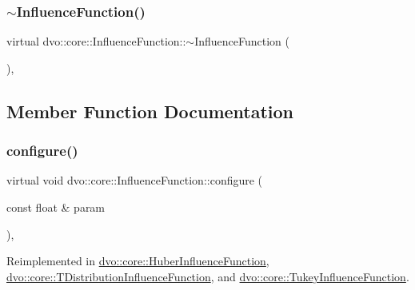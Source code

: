 \subsubsection{\texorpdfstring{$\sim$\+Influence\+Function()}{~InfluenceFunction()}}
{\footnotesize\ttfamily virtual dvo\+::core\+::\+Influence\+Function\+::$\sim$\+Influence\+Function (\begin{DoxyParamCaption}{ }\end{DoxyParamCaption})\hspace{0.3cm}{\ttfamily [inline]}, {\ttfamily [virtual]}}



\subsection{Member Function Documentation}
\mbox{\label{classdvo_1_1core_1_1_influence_function_a4773b03ca609bc5d8391d09d92ab34ad}} 
\subsubsection{\texorpdfstring{configure()}{configure()}}
{\footnotesize\ttfamily virtual void dvo\+::core\+::\+Influence\+Function\+::configure (\begin{DoxyParamCaption}\item[{const float \&}]{param }\end{DoxyParamCaption})\hspace{0.3cm}{\ttfamily [inline]}, {\ttfamily [virtual]}}



Reimplemented in \mbox{\hyperlink{classdvo_1_1core_1_1_huber_influence_function_aab5a25ad6f632e829c8ad2ccf073fdec}{dvo\+::core\+::\+Huber\+Influence\+Function}}, \mbox{\hyperlink{classdvo_1_1core_1_1_t_distribution_influence_function_ad9030e81f013c14015c3ad97a2f821be}{dvo\+::core\+::\+T\+Distribution\+Influence\+Function}}, and \mbox{\hyperlink{classdvo_1_1core_1_1_tukey_influence_function_afa49d538d3eee4c545bb690a0aca0f11}{dvo\+::core\+::\+Tukey\+Influence\+Function}}.

\mbox{\label{classdvo_1_1core_1_1_influence_function_a158082c763fa9de460e75a285bb91f1e}} 
